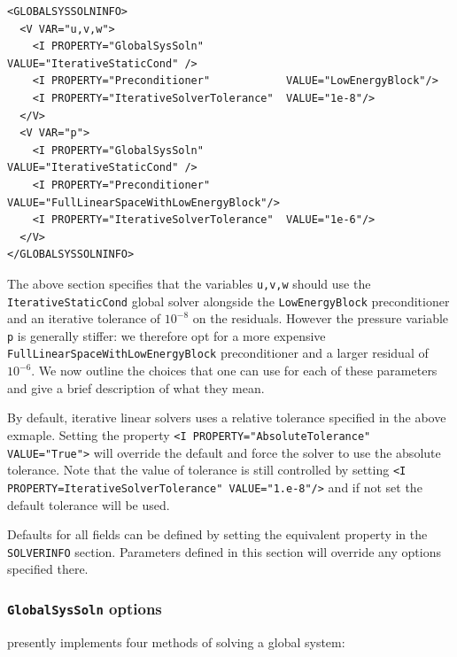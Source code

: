 \begin{lstlisting}[style=XMLStyle]
<GLOBALSYSSOLNINFO>
  <V VAR="u,v,w">
    <I PROPERTY="GlobalSysSoln"             VALUE="IterativeStaticCond" />
    <I PROPERTY="Preconditioner"            VALUE="LowEnergyBlock"/>
    <I PROPERTY="IterativeSolverTolerance"  VALUE="1e-8"/>
  </V>
  <V VAR="p">
    <I PROPERTY="GlobalSysSoln"             VALUE="IterativeStaticCond" />
    <I PROPERTY="Preconditioner"     VALUE="FullLinearSpaceWithLowEnergyBlock"/>
    <I PROPERTY="IterativeSolverTolerance"  VALUE="1e-6"/>
  </V>
</GLOBALSYSSOLNINFO>
\end{lstlisting}

The above section specifies that the variables \texttt{u,v,w} should use the
\texttt{IterativeStaticCond} global solver alongside the \texttt{LowEnergyBlock}
preconditioner and an iterative tolerance of $10^{-8}$ on the residuals. However
the pressure variable \texttt{p} is generally stiffer: we therefore opt for a
more expensive \texttt{FullLinearSpaceWithLowEnergyBlock} preconditioner and a
larger residual of $10^{-6}$. We now outline the choices that one can use for
each of these parameters and give a brief description of what they mean.

By default, iterative linear solvers uses a relative tolerance specified in the
above exmaple. Setting the property \texttt{<I PROPERTY="AbsoluteTolerance" VALUE="True">}
will override the default and force the solver to use the absolute tolerance.
Note that the value of tolerance is still
controlled by setting \texttt{<I PROPERTY=IterativeSolverTolerance" VALUE="1.e-8"/>}
and if not set the default tolerance will be used.

Defaults for all fields can be defined by setting the equivalent property in
the \texttt{SOLVERINFO} section. Parameters defined in this section will
override any options specified there.


\subsubsection{\texttt{GlobalSysSoln} options}

\nekpp presently implements four methods of solving a global system:

